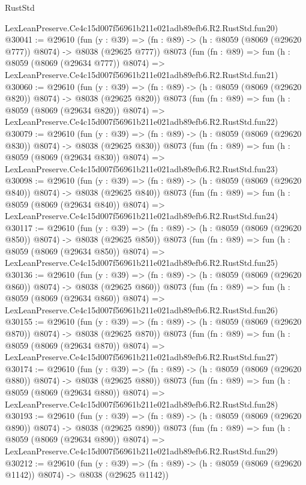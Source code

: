 \begin{lexlean}{RustStd}
\begin{coremodule}
    LexLeanPreserve.Ce4c15d007f56961b211e021adb89efb6.R2.RustStd.fun20)
@30041 := @29610
    (fun (y : @39) => (fn : @89) -> (h : @8059 (@8069 (@29620 @777)) @8074) -> @8038 (@29625 @777))
    @8073
    (fun (fn : @89) =>
    fun (h : @8059 (@8069 (@29634 @777)) @8074) =>
    LexLeanPreserve.Ce4c15d007f56961b211e021adb89efb6.R2.RustStd.fun21)
@30060 := @29610
    (fun (y : @39) => (fn : @89) -> (h : @8059 (@8069 (@29620 @820)) @8074) -> @8038 (@29625 @820))
    @8073
    (fun (fn : @89) =>
    fun (h : @8059 (@8069 (@29634 @820)) @8074) =>
    LexLeanPreserve.Ce4c15d007f56961b211e021adb89efb6.R2.RustStd.fun22)
@30079 := @29610
    (fun (y : @39) => (fn : @89) -> (h : @8059 (@8069 (@29620 @830)) @8074) -> @8038 (@29625 @830))
    @8073
    (fun (fn : @89) =>
    fun (h : @8059 (@8069 (@29634 @830)) @8074) =>
    LexLeanPreserve.Ce4c15d007f56961b211e021adb89efb6.R2.RustStd.fun23)
@30098 := @29610
    (fun (y : @39) => (fn : @89) -> (h : @8059 (@8069 (@29620 @840)) @8074) -> @8038 (@29625 @840))
    @8073
    (fun (fn : @89) =>
    fun (h : @8059 (@8069 (@29634 @840)) @8074) =>
    LexLeanPreserve.Ce4c15d007f56961b211e021adb89efb6.R2.RustStd.fun24)
@30117 := @29610
    (fun (y : @39) => (fn : @89) -> (h : @8059 (@8069 (@29620 @850)) @8074) -> @8038 (@29625 @850))
    @8073
    (fun (fn : @89) =>
    fun (h : @8059 (@8069 (@29634 @850)) @8074) =>
    LexLeanPreserve.Ce4c15d007f56961b211e021adb89efb6.R2.RustStd.fun25)
@30136 := @29610
    (fun (y : @39) => (fn : @89) -> (h : @8059 (@8069 (@29620 @860)) @8074) -> @8038 (@29625 @860))
    @8073
    (fun (fn : @89) =>
    fun (h : @8059 (@8069 (@29634 @860)) @8074) =>
    LexLeanPreserve.Ce4c15d007f56961b211e021adb89efb6.R2.RustStd.fun26)
@30155 := @29610
    (fun (y : @39) => (fn : @89) -> (h : @8059 (@8069 (@29620 @870)) @8074) -> @8038 (@29625 @870))
    @8073
    (fun (fn : @89) =>
    fun (h : @8059 (@8069 (@29634 @870)) @8074) =>
    LexLeanPreserve.Ce4c15d007f56961b211e021adb89efb6.R2.RustStd.fun27)
@30174 := @29610
    (fun (y : @39) => (fn : @89) -> (h : @8059 (@8069 (@29620 @880)) @8074) -> @8038 (@29625 @880))
    @8073
    (fun (fn : @89) =>
    fun (h : @8059 (@8069 (@29634 @880)) @8074) =>
    LexLeanPreserve.Ce4c15d007f56961b211e021adb89efb6.R2.RustStd.fun28)
@30193 := @29610
    (fun (y : @39) => (fn : @89) -> (h : @8059 (@8069 (@29620 @890)) @8074) -> @8038 (@29625 @890))
    @8073
    (fun (fn : @89) =>
    fun (h : @8059 (@8069 (@29634 @890)) @8074) =>
    LexLeanPreserve.Ce4c15d007f56961b211e021adb89efb6.R2.RustStd.fun29)
@30212 := @29610
    (fun (y : @39) =>
    (fn : @89) -> (h : @8059 (@8069 (@29620 @1142)) @8074) -> @8038 (@29625 @1142))

\end{coremodule}
\end{lexlean}
